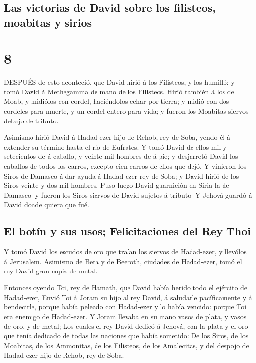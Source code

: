 \hypertarget{las-victorias-de-david-sobre-los-filisteos-moabitas-y-sirios}{%
\subsection{Las victorias de David sobre los filisteos, moabitas y
sirios}\label{las-victorias-de-david-sobre-los-filisteos-moabitas-y-sirios}}

\hypertarget{section-7}{%
\section{8}\label{section-7}}

 DESPUÉS de esto aconteció, que David hirió á los Filisteos,
y los humilló: y tomó David á Methegamma de mano de los Filisteos.
 Hirió también á los de Moab, y midiólos con cordel,
haciéndolos echar por tierra; y midió con dos cordeles para muerte, y un
cordel entero para vida; y fueron los Moabitas siervos debajo de
tributo.

 Asimismo hirió David á Hadad-ezer hijo de Rehob, rey de
Soba, yendo él á extender su término hasta el río de Eufrates.
 Y tomó David de ellos mil y setecientos de á caballo, y
veinte mil hombres de á pie; y desjarretó David los caballos de todos
los carros, excepto cien carros de ellos que dejó.  Y
vinieron los Siros de Damasco á dar ayuda á Hadad-ezer rey de Soba; y
David hirió de los Siros veinte y dos mil hombres.  Puso
luego David guarnición en Siria la de Damasco, y fueron los Siros
siervos de David sujetos á tributo. Y Jehová guardó á David donde quiera
que fué.

\hypertarget{el-botuxedn-y-sus-usos-felicitaciones-del-rey-thoi}{%
\subsection{El botín y sus usos; Felicitaciones del Rey
Thoi}\label{el-botuxedn-y-sus-usos-felicitaciones-del-rey-thoi}}

 Y tomó David los escudos de oro que traían los siervos de
Hadad-ezer, y llevólos á Jerusalem.  Asimismo de Beta y de
Beeroth, ciudades de Hadad-ezer, tomó el rey David gran copia de metal.

 Entonces oyendo Toi, rey de Hamath, que David había herido
todo el ejército de Hadad-ezer,  Envió Toi á Joram su hijo
al rey David, á saludarle pacíficamente y á bendecirle, porque había
peleado con Hadad-ezer y lo había vencido: porque Toi era enemigo de
Hadad-ezer. Y Joram llevaba en su mano vasos de plata, y vasos de oro, y
de metal;  Los cuales el rey David dedicó á Jehová, con la
plata y el oro que tenía dedicado de todas las naciones que había
sometido:  De los Siros, de los Moabitas, de los Ammonitas,
de los Filisteos, de los Amalecitas, y del despojo de Hadad-ezer hijo de
Rehob, rey de Soba.

